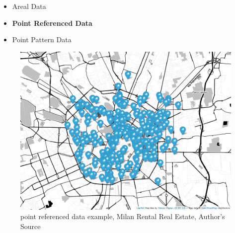 \documentclass[
  12pt,
  a4paper,
  oneside]{book}
\providecommand{\tightlist}{%
  \setlength{\itemsep}{0pt}\setlength{\parskip}{0pt}}
\theoremstyle{definition}
\theoremstyle{definition}
\theoremstyle{definition}
\theoremstyle{remark}
\begin{document}
\begin{itemize}
\tightlist
\item
  Areal Data
\item
  \textbf{Point Referenced Data}
\item
  Point Pattern Data
\end{itemize}

\begin{figure}
\centering
\includegraphics{images/map.png}
\caption{point referenced data example, Milan Rental Real Estate, Author's Source}
\end{figure}
\end{document}

